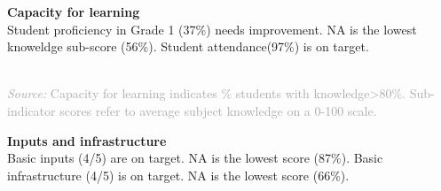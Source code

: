 \documentclass[twocolumn]{article}
\begin{document}
\textbf{Capacity for learning}\\
Student proficiency in Grade 1 (37\%) needs improvement. NA is the
lowest knoweldge sub-score (56\%). Student attendance(97\%) is on
target.

\begin{table}[H]
\\
{\scriptsize
    \textcolor{darkgray}{\textit{Source:} Capacity for learning indicates \% students with knowledge\textgreater{80\%}. Sub-indicator scores refer to average subject knowledge on a 0-100 scale.}
  }

\end{table}
\raggedbottom

\textbf{Inputs and infrastructure}\\
Basic inputs (4/5) are on target. NA is the lowest score (87\%). Basic
infrastructure (4/5) is on target. NA is the lowest score (66\%).
\end{document}
